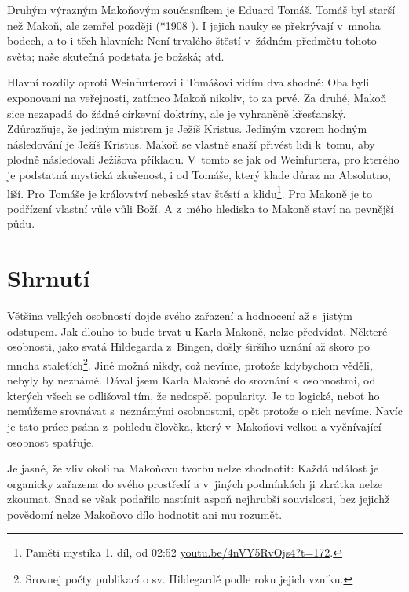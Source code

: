 Druhým výrazným Makoňovým současníkem je Eduard Tomáš. Tomáš byl starší než
Makoň, ale zemřel později (*1908 ). I jejich nauky se překrývají
v~mnoha bodech, a to i těch hlavních: Není trvalého štěstí v~žádném předmětu
tohoto světa; naše skutečná podstata je božská; atd.

Hlavní rozdíly oproti Weinfurterovi i Tomášovi vidím dva shodné: Oba byli
exponovaní na veřejnosti, zatímco Makoň nikoliv, to za prvé. Za druhé, Makoň
sice nezapadá do žádné církevní doktríny, ale je vyhraněně křesťanský.
Zdůrazňuje, že jediným mistrem je Ježíš Kristus. Jediným vzorem hodným
následování je Ježíš Kristus. Makoň se vlastně snaží přivést lidi k~tomu, aby
plodně následovali Ježíšova příkladu. V~tomto se jak od Weinfurtera, pro kterého
je podstatná mystická zkušenost, i od Tomáše, který klade důraz na Absolutno,
liší. Pro Tomáše je království nebeské stav štěstí a klidu\footnote{Paměti
mystika 1. díl, od 02:52 \url{youtu.be/4nVY5RvOjs4?t=172}.}. Pro Makoně je to
podřízení vlastní vůle vůli Boží. A z~mého hlediska to Makoně staví na pevnější
půdu.

\section{Shrnutí}

Většina velkých osobností dojde svého zařazení a hodnocení až s~jistým odstupem.
Jak dlouho to bude trvat u Karla Makoně, nelze předvídat. Některé osobnosti,
jako svatá Hildegarda z~Bingen, došly širšího uznání až skoro po mnoha
staletích\footnote{Srovnej počty publikací o sv. Hildegardě podle roku jejich
vzniku.}. Jiné možná nikdy, což nevíme, protože kdybychom věděli, nebyly by
neznámé. Dával jsem Karla Makoně do srovnání s~osobnostmi, od kterých všech se
odlišoval tím, že nedospěl popularity. Je to logické, neboť ho nemůžeme
srovnávat s~neznámými osobnostmi, opět protože o nich nevíme. Navíc je tato
práce psána z~pohledu člověka, který v~Makoňovi velkou a vyčnívající osobnost
spatřuje.

Je jasné, že vliv okolí na Makoňovu tvorbu nelze zhodnotit: Každá událost je
organicky zařazena do svého prostředí a v~jiných podmínkách ji zkrátka nelze
zkoumat. Snad se však podařilo nastínit aspoň nejhrubší souvislosti, bez jejichž
povědomí nelze Makoňovo dílo hodnotit ani mu rozumět.
